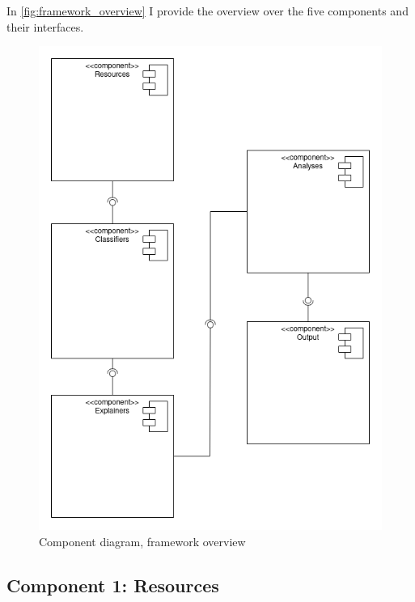 In \autoref{fig:framework_overview} I provide the overview over the five components and their interfaces.

\begin{figure}[H]
    \centering
    \includegraphics[width=\linewidth]{images/05_framework_eval/Component_diagram_overview_framework.png}
    \caption{Component diagram, framework overview}
    \label{fig:framework_overview}
\end{figure}

\subsection{Component 1: Resources}


